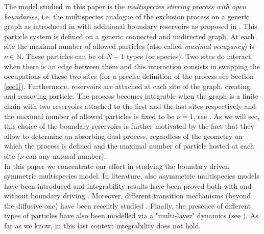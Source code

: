 \documentclass[10pt]{article}
\numberwithin{equation}{section}
\numberwithin{equation}{subsection}
\begin{document}
The model studied in this paper is the {\em  multispecies stirring process with open boundaries}, i.e. the multispecies analogue of the exclusion process on a generic graph as introduced in \cite{zhou2021orthogonal} with additional boundary reservoirs as proposed in \cite{vanicat2017exact}. 
This particle system is defined on a generic connected and undirected graph. At each site 
the maximal number of allowed particles {\color{blue}(also called \textit{maximal occupancy})} is $\nu\in \mathbb{N}$. These particles can be of $N-1$ types (or species). Two sites do interact when there is an edge between them and this interaction consists in swapping the occupations of these two sites (for a precise definition of the process see Section \ref{sec1}). 
Furthermore, reservoirs are attached at each site of the graph, creating and removing particle. The process becomes integrable when the graph is a finite chain with two reservoirs attached to the first and the last sites respectively and the maximal number of allowed particles is fixed to be $\nu=1$,  see \cite{vanicat2017exact}. {\color{blue}As we will see, this choice of the boundary reservoirs is further motivated by the fact that they allow to determine an absorbing dual process, regardless of the geometry on which the process is defined and  the maximal number of particle hosted at each site ($\nu$ can any natural number)}.\\
{\color{blue}In this paper we concentrate our effort in studying the boundary driven symmetric multispecies model. In literature, also asymmetric multispecies  models have been introduced \cite{schutz2017kardar} and integrability results have been proved both with \cite{crampe2016integrable, finn2018matrix} and without boundary driving \cite{mallick1,mallick2}. Moreover, different transition mechanisms (beyond the diffusive one) have been recently studied \cite{chatterjee2023multi}. Finally, the presence of different types of particles have also been modelled via a "multi-layer" dynamics (see \cite{redig2022ergodic,floreani2022switching}). As far as we know, in this last context integrability does not hold.} 
%




\end{document}
